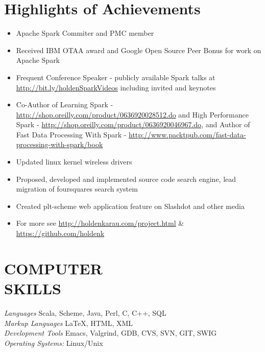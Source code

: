 \documentclass[10pt,line,margin=0.1]{newsres}
\begin{document}
\address{San Francisco, CA, USA}
\address{E-mail: holden@pigscanfly.ca, Cell: (425) 233-8271}
 
\begin{resume}
  \section{Highlights of Achievements}
  \begin{itemize}  \itemsep -2pt %
  \item{Apache Spark Commiter and PMC member}
  \item{Received IBM OTAA award and Google Open Source Peer Bonus for work on Apache Spark}
  \item{Frequent Conference Speaker - publicly available Spark talks at \url{http://bit.ly/holdenSparkVideos} including invited and keynotes}
  \item{Co-Author of Learning Spark - \url{http://shop.oreilly.com/product/0636920028512.do} and  High Performance Spark - \url{http://shop.oreilly.com/product/0636920046967.do}, and Author of Fast Data Processing With Spark - \url{http://www.packtpub.com/fast-data-processing-with-spark/book}}
  \item{Updated linux kernel wireless drivers}
  \item{Proposed, developed and implemented source code search engine, lead migration of foursquares search system}
  \item{Created plt-scheme web application feature on Slashdot and other media}
  \item{For more see \url{http://holdenkarau.com/project.html} \& \url{https://github.com/holdenk}}
\end{itemize}
\section{COMPUTER \\ SKILLS} {\sl Languages} Scala, Scheme, Java, Perl, C, C++, SQL \\
                {\sl Markup Languages} \LaTeX , HTML, XML \\
                {\sl Development Tools} Emacs, Valgrind, GDB, CVS, SVN, GIT, SWIG \\
                {\sl Operating Systems:}  Linux/Unix \\
 

\end{resume}
\end{document}

